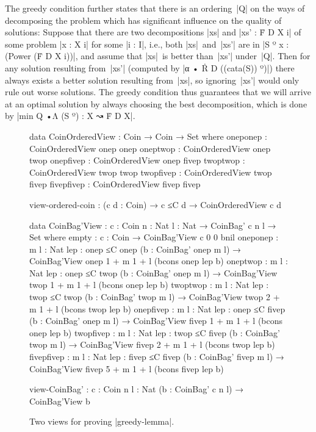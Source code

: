The greedy condition further states that there is an ordering~|Q| on the ways of decomposing the problem which has significant influence on the quality of solutions:
Suppose that there are two decompositions |xs| and |xs' : Ḟ D X i| of some problem |x : X i| for some |i : I|, i.e., both |xs|~and~|xs'| are in |S º x : (Power (Ḟ D X i))|, and assume that |xs|~is better than~|xs'| under~|Q|.
Then for any solution resulting from~|xs'| (computed by |α • Ṙ D ((cata(S)) º)|) there always exists a better solution resulting from~|xs|, so ignoring~|xs'| would only rule out worse solutions.
The greedy condition thus guarantees that we will arrive at an optimal solution by always choosing the best decomposition, which is done by |min Q •Λ (S º) : X ↝ Ḟ D X|.

\begin{figure}
\codefigure\fontsize{10.6pt}{0pt}
\begin{code}
data CoinOrderedView : Coin → Coin → Set where
  oneponep    : CoinOrderedView  onep   onep
  oneptwop    : CoinOrderedView  onep   twop
  onepfivep   : CoinOrderedView  onep   fivep
  twoptwop    : CoinOrderedView  twop   twop
  twopfivep   : CoinOrderedView  twop   fivep
  fivepfivep  : CoinOrderedView  fivep  fivep

view-ordered-coin : (c d : Coin) → c ≤C d → CoinOrderedView c d

data CoinBag'View : {c : Coin} {n : Nat} {l : Nat} → CoinBag' c n l → Set where
  empty       :  {c : Coin} → CoinBag'View {c} {0} {0} bnil
  oneponep    :  {m l : Nat} {lep : onep ≤C onep}
                 (b : CoinBag' onep m l) → CoinBag'View {onep} {1 + m} {1 + l} (bcons onep lep b)
  oneptwop    :  {m l : Nat} {lep : onep ≤C twop}
                 (b : CoinBag' onep m l) → CoinBag'View {twop} {1 + m} {1 + l} (bcons onep lep b)
  twoptwop    :  {m l : Nat} {lep : twop ≤C twop}
                 (b : CoinBag' twop m l) → CoinBag'View {twop} {2 + m} {1 + l} (bcons twop lep b)
  onepfivep   :  {m l : Nat} {lep : onep ≤C fivep}
                 (b : CoinBag' onep m l) → CoinBag'View {fivep} {1 + m} {1 + l} (bcons onep lep b)
  twopfivep   :  {m l : Nat} {lep : twop ≤C fivep}
                 (b : CoinBag' twop m l) → CoinBag'View {fivep} {2 + m} {1 + l} (bcons twop lep b)
  fivepfivep  :  {m l : Nat} {lep : fivep ≤C fivep}
                 (b : CoinBag' fivep m l) → CoinBag'View {fivep} {5 + m} {1 + l} (bcons fivep lep b)

view-CoinBag' : {c : Coin} {n l : Nat} (b : CoinBag' c n l) → CoinBag'View b
\end{code}
\caption{Two views for proving |greedy-lemma|.}
\label{fig:greedy-lemma-views}
\end{figure}

